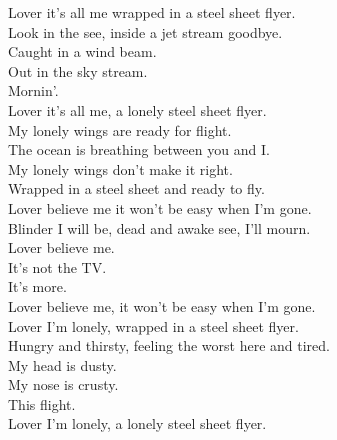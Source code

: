Lover it's all me wrapped in a steel sheet flyer. \\
Look in the  see, inside a jet stream goodbye. \\
Caught in a wind beam. \\
Out in the sky stream. \\
Mornin'. \\
Lover it's all me, a lonely steel sheet flyer. \\

My lonely wings are ready for flight. \\
The ocean is breathing between you and I. \\
My lonely wings don't make it right. \\
Wrapped in a steel sheet and ready to fly. \\

Lover believe me it won't be easy when I'm gone. \\
Blinder I will be, dead and awake see, I'll mourn. \\
Lover believe me. \\
It's not the TV. \\
It's more. \\
Lover believe me, it won't be easy when I'm gone. \\

Lover I'm lonely, wrapped in a steel sheet flyer. \\
Hungry and thirsty, feeling the worst here and tired. \\
My head is dusty. \\
My nose is crusty. \\
This flight. \\
Lover I'm lonely, a lonely steel sheet flyer. \\
